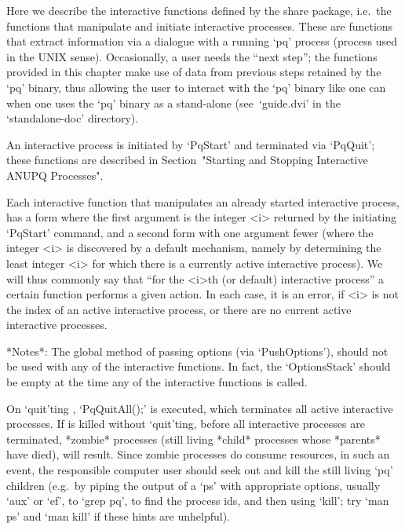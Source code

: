 

Here we describe the interactive functions defined by the {\ANUPQ}  share
package, i.e.~the functions  that  manipulate  and  initiate  interactive
{\ANUPQ} processes. These are functions that extract  information  via  a
dialogue with a running `pq' process (process used in  the  UNIX  sense).
Occasionally, a user needs the ``next step''; the functions  provided  in
this chapter make use of data from previous steps retained  by  the  `pq'
binary, thus allowing the user to interact with the `pq' binary like  one
can when one uses the `pq' binary as a  stand-alone  (see~`guide.dvi'  in
the `standalone-doc' directory).

An  interactive  {\ANUPQ}  process  is  initiated  by   `PqStart'   and
terminated  via  `PqQuit';   these   functions   are   described   in
Section~"Starting and Stopping Interactive ANUPQ Processes".

Each interactive {\ANUPQ} function that manipulates  an  already  started
interactive {\ANUPQ} process, has a form where the first argument is  the
integer <i> returned by the initiating `PqStart' command,  and  a  second
form with one argument fewer (where the integer <i> is  discovered  by  a
default mechanism, namely by determining the least integer <i> for  which
there is a currently active interactive {\ANUPQ} process). We  will  thus
commonly say that ``for  the  <i>th  (or  default)  interactive  {\ANUPQ}
process'' a certain function performs a given action. In each case, it is
an error, if <i> is not the index of an active  interactive  process,  or
there are no current active interactive processes.

*Notes*: 
The global method of passing options (via `PushOptions'), should  not  be
used with any of the interactive functions. In fact,  the  `OptionsStack'
should be empty at the time any of the interactive functions is called.

On `quit'ting {\GAP}, `PqQuitAll();' is executed,  which  terminates  all
active interactive  {\ANUPQ}  processes.  If  {\GAP}  is  killed  without
`quit'ting, before all interactive  {\ANUPQ}  processes  are  terminated,
*zombie* processes (still living *child* processes whose  *parents*  have
died), will result. Since zombie processes do consume resources, in  such
an event, the responsible computer user should  seek  out  and  kill  the
still living `pq' children (e.g.~by piping the  output  of  a  `ps'  with
appropriate options, usually `aux' or `ef', to `grep  pq',  to  find  the
process ids, and then using `kill'; try `man ps' and `man kill' if  these
hints are unhelpful).

